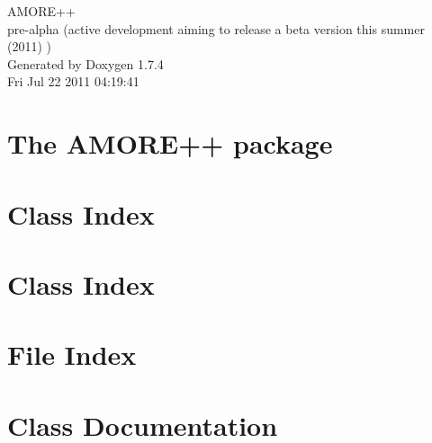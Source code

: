 \documentclass[a4paper]{book}
\begin{document}
\hypersetup{pageanchor=false}
\begin{titlepage}
\vspace*{7cm}
\begin{center}
{\Large AMORE++ \\[1ex]\large pre-\/alpha (active development aiming to release a beta version this summer (2011) ) }\\
\vspace*{1cm}
{\large Generated by Doxygen 1.7.4}\\
\vspace*{0.5cm}
{\small Fri Jul 22 2011 04:19:41}\\
\end{center}
\end{titlepage}
\clearemptydoublepage
{}
\tableofcontents
\clearemptydoublepage
{}
\hypersetup{pageanchor=true}
\chapter{The AMORE++ package}
\label{index}\hypertarget{index}{}
\chapter{Class Index}

\chapter{Class Index}

\chapter{File Index}

\chapter{Class Documentation}



















































\end{document}
